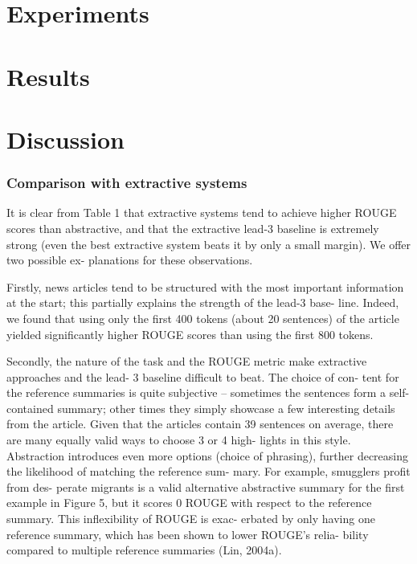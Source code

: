 \documentclass[UTF8]{ctexart}
\begin{document}
    \section{Experiments}

    \section{Results}


    \section{Discussion}

    \subsubsection{Comparison with extractive systems}
    It is clear from Table 1 that extractive systems tend
to achieve higher ROUGE scores than abstractive,
and that the extractive lead-3 baseline is extremely
strong (even the best extractive system beats it by
only a small margin). We offer two possible ex-
planations for these observations.

Firstly, news articles tend to be structured with
the most important information at the start; this
partially explains the strength of the lead-3 base-
line. Indeed, we found that using only the first 400
tokens (about 20 sentences) of the article yielded
significantly higher ROUGE scores than using the
first 800 tokens.

Secondly, the nature of the task and the ROUGE
metric make extractive approaches and the lead-
3 baseline difficult to beat. The choice of con-
tent for the reference summaries is quite subjective
– sometimes the sentences form a self-contained
summary; other times they simply showcase a few
interesting details from the article. Given that the
articles contain 39 sentences on average, there are
many equally valid ways to choose 3 or 4 high-
lights in this style. Abstraction introduces even
more options (choice of phrasing), further decreasing the likelihood of matching the reference sum-
mary. For example, smugglers profit from des-
perate migrants is a valid alternative abstractive
summary for the first example in Figure 5, but
it scores 0 ROUGE with respect to the reference
summary. This inflexibility of ROUGE is exac-
erbated by only having one reference summary,
which has been shown to lower ROUGE’s relia-
bility compared to multiple reference summaries
(Lin, 2004a).
\end{document}

